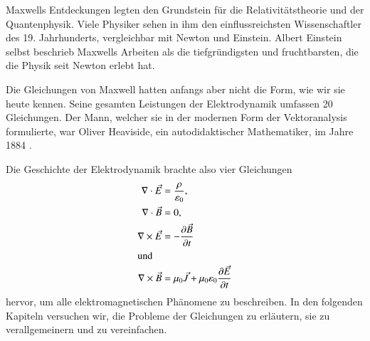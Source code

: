 Maxwells Entdeckungen legten den Grundstein für die Relativitätstheorie und der Quantenphysik.
Viele Physiker sehen in ihm den einflussreichsten Wissenschaftler des 19. Jahrhunderts, vergleichbar mit Newton und Einstein.
Albert Einstein selbst beschrieb Maxwells Arbeiten als die tiefgründigsten und fruchtbarsten, die die Physik seit Newton erlebt hat.

Die Gleichungen von Maxwell hatten anfangs aber nicht die Form, wie wir sie heute kennen. 
Seine gesamten Leistungen der Elektrodynamik umfassen 20 Gleichungen.
Der Mann, welcher sie in der modernen Form der Vektoranalysis formulierte, war Oliver Heaviside, ein autodidaktischer Mathematiker, im Jahre 1884 \cite{maxwell:heaviside}.

Die Geschichte der Elektrodynamik brachte also vier Gleichungen
\begin{align*}
	\nabla \cdot \vec{E} &= \frac{\rho}{\varepsilon_0} ,
	\\
	\nabla \cdot \vec{B} &= 0 ,
	\\
	\nabla \times \vec{E} &= - \frac{\d \vec{B}}{\d t} 
	\\
	\intertext{und}
	\nabla \times \vec{B} &= \mu_0 \vec{J} + \mu_0 \varepsilon_0 \frac{\d \vec{E}}{\d t}
\end{align*}
hervor, um alle elektromagnetischen Phänomene zu beschreiben.
In den folgenden Kapiteln versuchen wir, die Probleme der Gleichungen zu erläutern, sie zu verallgemeinern und zu vereinfachen.








